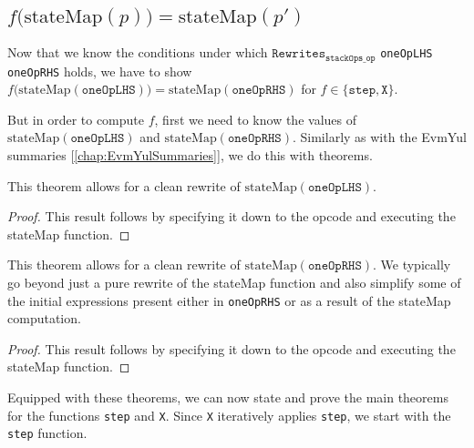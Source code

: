 \subsection{$f\bigl(\text{stateMap}(p)\bigr) = \text{stateMap}(p')$}

Now that we know the conditions under which
$\texttt{Rewrites}_{\texttt{stackOps_op}}$ \texttt{oneOpLHS} \texttt{oneOpRHS} holds,
we have to show $f\bigl(\text{stateMap}(\texttt{oneOpLHS})\bigr) =
\text{stateMap}(\texttt{oneOpRHS})$ for $f\in\{\texttt{step}, \texttt{X}\}$.

But in order to compute $f$, first we need to know the values of
$\text{stateMap}(\texttt{oneOpLHS})$ and $\text{stateMap}(\texttt{oneOpRHS})$.
Similarly as with the EvmYul summaries [\ref{chap:EvmYulSummaries}], we do this
with theorems.

\begin{theorem}\label{thm:oneOpLHS_equiv}
\leanok{}
This theorem allows for a clean rewrite of $\text{stateMap}(\texttt{oneOpLHS})$.
\end{theorem}
\begin{proof}
\leanok
This result follows by specifying it down to the opcode and executing the
stateMap function.
\end{proof}

\begin{theorem}\label{thm:oneOpRHS_equiv}
\leanok{}
This theorem allows for a clean rewrite of $\text{stateMap}(\texttt{oneOpRHS})$.
We typically go beyond just a pure rewrite of the stateMap function and also
simplify some of the initial expressions present either in \texttt{oneOpRHS} or
as a result of the stateMap computation.
\end{theorem}
\begin{proof}
This result follows by specifying it down to the opcode and executing the
stateMap function.
\end{proof}

Equipped with these theorems, we can now state and prove the main theorems for
the functions \texttt{step} and \texttt{X}. Since \texttt{X} iteratively applies
\texttt{step}, we start with the \texttt{step} function.

